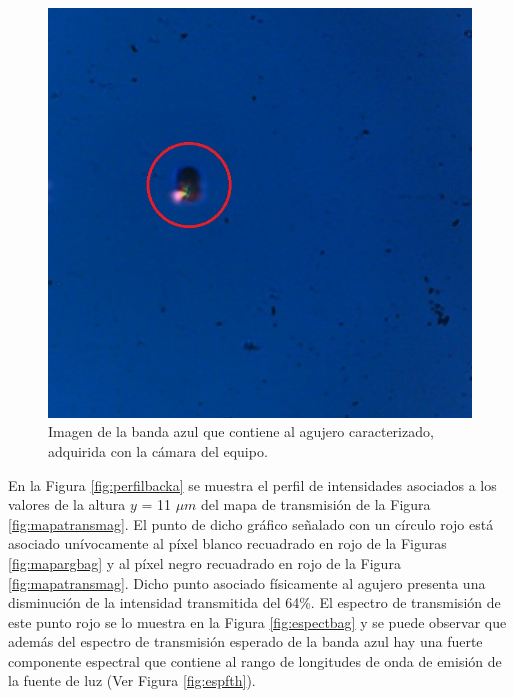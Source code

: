  \begin{figure}[H]
	\centering
	\includegraphics[scale=0.55]{Figs/microespectrometro/imagenagj.jpg}
	\caption{Imagen de la banda azul que contiene al agujero caracterizado, adquirida con la cámara del equipo.}
	\label{fig:agujeroimg}
\end{figure}


En la Figura \ref{fig:perfilbacka} se muestra el perfil de intensidades asociados a los valores de la altura $\textit{y}$ = 11 $\mu m$ del mapa de transmisión de la Figura \ref{fig:mapatransmag}. El punto de dicho gráfico señalado con un círculo rojo está asociado unívocamente al píxel blanco recuadrado en rojo de la Figuras \ref{fig:mapargbag} y al píxel negro recuadrado en rojo de la Figura \ref{fig:mapatransmag}. Dicho punto asociado físicamente al agujero presenta una disminución de la intensidad transmitida del 64\%. El espectro de transmisión de este punto rojo se lo muestra en la Figura \ref{fig:espectbag} y se puede observar que además del espectro de transmisión esperado de la banda azul hay una fuerte componente espectral que contiene al rango de longitudes de onda de emisión de la fuente de luz (Ver Figura \ref{fig:espfth}). 

